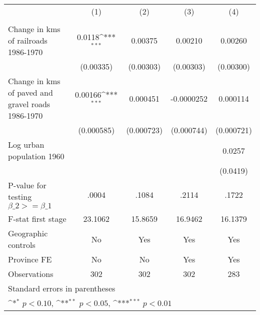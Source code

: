 {
\def\sym#1{\ifmmode^{#1}\else\(^{#1}\)\fi}
\begin{tabular}{l*{4}{c}}
\hline\hline
                &\multicolumn{1}{c}{(1)}&\multicolumn{1}{c}{(2)}&\multicolumn{1}{c}{(3)}&\multicolumn{1}{c}{(4)}\\
                &\multicolumn{1}{c}{}&\multicolumn{1}{c}{}&\multicolumn{1}{c}{}&\multicolumn{1}{c}{}\\
\hline
Change in kms of railroads 1986-1970&   0.0118\sym{***}&  0.00375         &  0.00210         &  0.00260         \\
                &(0.00335)         &(0.00303)         &(0.00303)         &(0.00300)         \\
[1em]
Change in kms of paved and gravel roads 1986-1970&  0.00166\sym{***}& 0.000451         &-0.0000252         & 0.000114         \\
                &(0.000585)         &(0.000723)         &(0.000744)         &(0.000721)         \\
[1em]
Log urban population 1960&                  &                  &                  &   0.0257         \\
                &                  &                  &                  & (0.0419)         \\
\hline
P-value for testing $\beta\_{2} >= \beta\_{1}$&    .0004         &    .1084         &    .2114         &    .1722         \\
F-stat first stage&  23.1062         &  15.8659         &  16.9462         &  16.1379         \\
Geographic controls&       No         &      Yes         &      Yes         &      Yes         \\
Province FE     &       No         &       No         &      Yes         &      Yes         \\
Observations    &      302         &      302         &      302         &      283         \\
\hline\hline
\multicolumn{5}{l}{\footnotesize Standard errors in parentheses}\\
\multicolumn{5}{l}{\footnotesize \sym{*} \(p<0.10\), \sym{**} \(p<0.05\), \sym{***} \(p<0.01\)}\\
\end{tabular}
}
